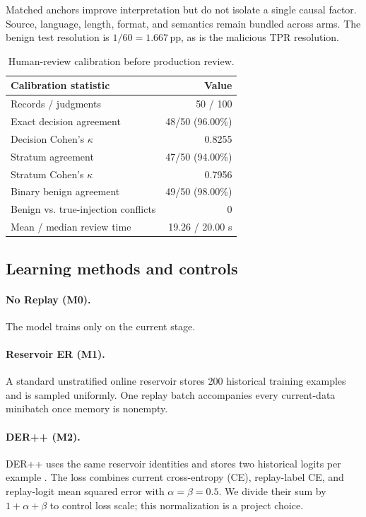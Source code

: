 \documentclass[conference]{IEEEtran}
\newcommand{\pp}{\,\mathrm{pp}}
\begin{document}
Matched anchors improve interpretation but do not isolate a single causal factor. Source, language, length, format, and semantics remain bundled across arms. The benign test resolution is $1/60=1.667\pp$, as is the malicious TPR resolution.

\begin{table}[t]
\caption{Human-review calibration before production review.}
\label{tab:calibration}

\centering
\small
\begin{tabular}{@{}lr@{}}
\toprule
Calibration statistic & Value \\
\midrule
Records / judgments & 50 / 100 \\
Exact decision agreement & 48/50 (96.00\%) \\
Decision Cohen's $\kappa$ & 0.8255 \\
Stratum agreement & 47/50 (94.00\%) \\
Stratum Cohen's $\kappa$ & 0.7956 \\
Binary benign agreement & 49/50 (98.00\%) \\
Benign vs. true-injection conflicts & 0 \\
Mean / median review time & 19.26 / 20.00 s \\
\bottomrule
\end{tabular}


\end{table}
\subsection{Learning methods and controls}
\paragraph{No Replay (M0).}
The model trains only on the current stage.

\paragraph{Reservoir ER (M1).}
A standard unstratified online reservoir stores 200 historical training examples and is sampled uniformly. One replay batch accompanies every current-data minibatch once memory is nonempty.

\paragraph{DER++ (M2).}
DER++ uses the same reservoir identities and stores two historical logits per example \cite{buzzega2020dark}. The loss combines current cross-entropy (CE), replay-label CE, and replay-logit mean squared error with $\alpha=\beta=0.5$. We divide their sum by $1+\alpha+\beta$ to control loss scale; this normalization is a project choice.
\end{document}

